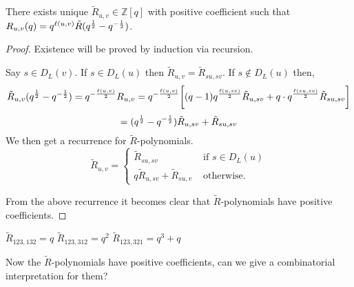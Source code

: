 \begin{theorem}
	There exists unique $\tilde R_{u,v}\in \mathbb{Z}[q]$ with positive coefficient such that $R_{u,v}(q)=q^{\ell(u,v)} \tilde{R}(q^{1 \over 2}-q^{-{1\over2}})$.
\end{theorem}
\begin{proof}
	Existence will be proved by induction via recursion.
	
	Say $s\in D_L(v)$. If $s\in D_L(u)$ then $\tilde R_{u,v}=\tilde R_{su,sv}$. If $s\notin D_L(u)$ then,
	\[\tilde R_{u,v}(q^{1\over 2}-q^{-{1\over 2}})=q^{-{\ell(u,v)\over 2}}R_{u,v}=q^{-{\ell(u,v)\over 2}}\bigg[(q-1)q^{\ell(u,sv)\over 2}\tilde R_{u,sv}+q\cdot q^{\ell(su,sv)\over 2}\tilde R_{su,sv}\bigg]\]
	\[=(q^{1\over 2}-q^{-{1\over 2}})\tilde R_{u,sv}+\tilde R_{su,sv}\]
	We then get a recurrence for $\tilde R$-polynomials.
	\begin{equation}
		\tilde R_{u,v}=\begin{cases}
			\tilde R_{su,sv}&\text{ if }s\in D_L(u)\\
			q\tilde R_{u,sv}+\tilde R_{su,v}&\text{ otherwise}.
		\end{cases}
	\end{equation}
	
	From the above recurrence it becomes clear that $\tilde R$-polynomials have positive coefficients.
\end{proof}
\begin{example}
	$\tilde R_{123,132}=q$\quad
	$\tilde R_{123,312}=q^2$\quad
	$\tilde R_{123,321}=q^3+q$
\end{example}
Now the $\tilde R$-polynomials have positive coefficients, can we give a combinatorial interpretation for them?

